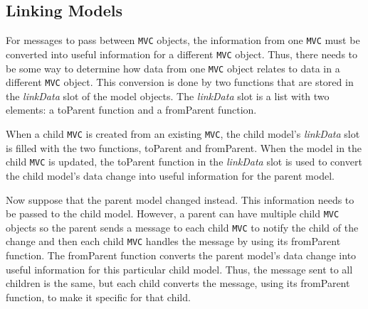 \documentclass[11pt]{article}
\newcommand{\Rfunction}[1]{{\textsf{#1}}}
\newcommand{\Robject}[1]{{\texttt{#1}}}
\newcommand{\Rslot}[1]{\textsl{#1}}
\begin{document}
\subsection{Linking Models}
\label{Ssec:MultLink}

For messages to pass between \Robject{MVC} objects, the information from one
\Robject{MVC} must be converted into useful information for a different
\Robject{MVC} object.  Thus, there needs to be some way to determine how data
from one \Robject{MVC} object relates to data in a different \Robject{MVC}
object.  This conversion is done by two functions that are stored in the
\Rslot{linkData} slot of the model objects.  The \Rslot{linkData}
slot is a list with two elements: a \Rfunction{toParent} function and a
\Rfunction{fromParent} function. 

When a child \Robject{MVC} is created from an existing \Robject{MVC}, the
child model's \Rslot{linkData} slot is filled with the two functions,
\Rfunction{toParent} and \Rfunction{fromParent}.  When the model in
the child \Robject{MVC} is updated, the \Rfunction{toParent} function in the
\Rslot{linkData} slot is used to convert the child model's data
change into useful information for the parent model.  

Now suppose that the parent model changed instead.  This information
needs to be passed to the child model.  However, a parent can have
multiple child \Robject{MVC} objects so the parent sends a message to
each child \Robject{MVC} to notify the child of the change and then
each child \Robject{MVC} handles the message by using its
\Rfunction{fromParent} function.  The \Rfunction{fromParent} function
converts the parent model's data change into useful information for
this particular child model.  Thus, the message sent to all children is the
same, but each child converts the message, using its \Rfunction{fromParent}
function, to make it specific for that child.
\end{document}
